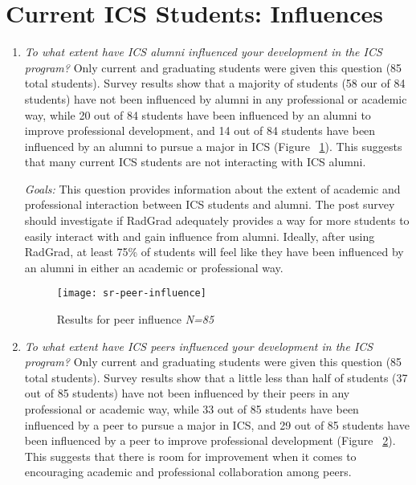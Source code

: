 \section{Current ICS Students: Influences}
\begin{enumerate}
\begin{figure}[h]
\centering
\texttt{[image: sr-alumni-influence]}
\caption{Results for alumni influence \textit{N=85}}
\label{alumni-influence}
\end{figure}
\item \textit{To what extent have ICS alumni influenced your development in the ICS program?}
Only current and graduating students were given this question (85 total students). Survey results show that a majority of students (58 our of 84 students) have not been influenced by alumni in any professional or academic way, while 20 out of 84 students have been influenced by an alumni to improve professional development, and 14 out of 84 students have been influenced by an alumni to pursue a major in ICS (Figure ~\ref{alumni-influence}). This suggests that many current ICS students are not interacting with ICS alumni.

\textit{Goals:} This question provides information about the extent of academic and professional interaction between ICS students and alumni. The post survey should investigate if RadGrad adequately provides a way for more students to easily interact with and gain influence from alumni.  Ideally, after using RadGrad, at least 75\% of students will feel like they have been influenced by an alumni in either an academic or professional way. 
   
\begin{figure}[h]
\centering
\texttt{[image: sr-peer-influence]}
\caption{Results for peer influence \textit{N=85}}
\label{peer-influence}
\end{figure}
\item \textit{To what extent have ICS peers influenced your development in the ICS program?}
Only current and graduating students were given this question (85 total students). Survey results show that a little less than half of students (37 out of 85 students) have not been influenced by their peers in any professional or academic way, while 33 out of 85 students have been influenced by a peer to pursue a major in ICS, and 29 out of 85 students have been influenced by a peer to improve professional development (Figure ~\ref{peer-influence}). This suggests that there is room for improvement when it comes to encouraging academic and professional collaboration among peers. 


\end{enumerate}
